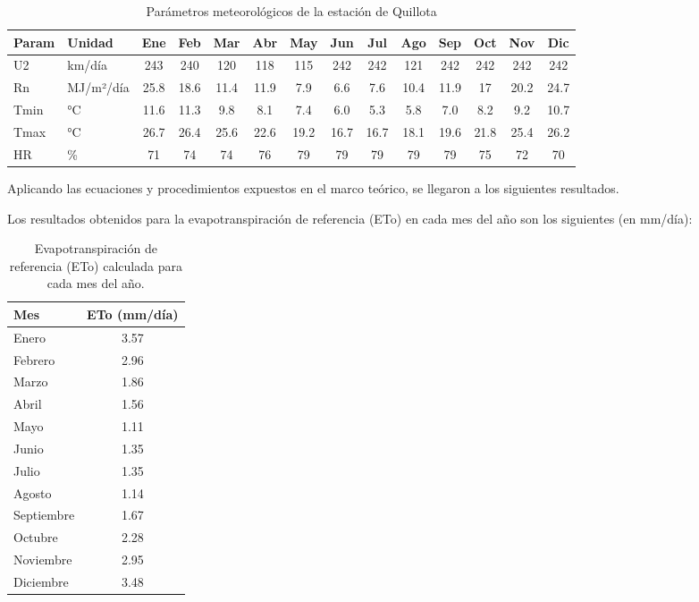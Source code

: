 \documentclass{article}  %
\begin{document}
\begin{table}[H]
  \centering
  \begin{tabular}{|l|l|c|c|c|c|c|c|c|c|c|c|c|c|}
  \hline
  \textbf{Param} & \textbf{Unidad} & \textbf{Ene} & \textbf{Feb} & \textbf{Mar} & \textbf{Abr} & \textbf{May} & \textbf{Jun} & \textbf{Jul} & \textbf{Ago} & \textbf{Sep} & \textbf{Oct} & \textbf{Nov} & \textbf{Dic} \\ \hline
  U2    & km/día       & 243 & 240 & 120 & 118 & 115 & 242 & 242 & 121 & 242 & 242 & 242 & 242 \\ \hline
  Rn    & MJ/m²/día    & 25.8 & 18.6 & 11.4 & 11.9 & 7.9 & 6.6 & 7.6 & 10.4 & 11.9 & 17 & 20.2 & 24.7 \\ \hline
  Tmin  & °C           & 11.6 & 11.3 & 9.8 & 8.1 & 7.4 & 6.0 & 5.3 & 5.8 & 7.0 & 8.2 & 9.2 & 10.7 \\ \hline
  Tmax  & °C           & 26.7 & 26.4 & 25.6 & 22.6 & 19.2 & 16.7 & 16.7 & 18.1 & 19.6 & 21.8 & 25.4 & 26.2 \\ \hline
  HR    & \%           & 71 & 74 & 74 & 76 & 79 & 79 & 79 & 79 & 79 & 75 & 72 & 70 \\ \hline
  \end{tabular}
  \caption{Parámetros meteorológicos de la estación de Quillota}
\end{table}

Aplicando las ecuaciones y procedimientos expuestos en el marco teórico, se llegaron a los siguientes resultados.

Los resultados obtenidos para la evapotranspiración de referencia (ETo) en cada mes del año son los siguientes (en mm/día):

\begin{table}[H]
\centering
\begin{tabular}{|l|c|}
\hline
\textbf{Mes} & \textbf{ETo (mm/día)} \\ \hline
Enero        & 3.57                  \\ \hline
Febrero      & 2.96                  \\ \hline
Marzo        & 1.86                  \\ \hline
Abril        & 1.56                  \\ \hline
Mayo         & 1.11                  \\ \hline
Junio        & 1.35                  \\ \hline
Julio        & 1.35                  \\ \hline
Agosto       & 1.14                  \\ \hline
Septiembre   & 1.67                  \\ \hline
Octubre      & 2.28                  \\ \hline
Noviembre    & 2.95                  \\ \hline
Diciembre    & 3.48                  \\ \hline
\end{tabular}
\caption{Evapotranspiración de referencia (ETo) calculada para cada mes del año.}
\end{table}
\end{document}

